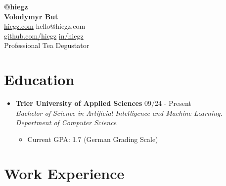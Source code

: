 \documentclass[]{article}
\begin{document}
\begin{center}
    \textbf{\Large @hiegz} \\[3pt]
    \textbf{\huge Volodymyr But} \\[7pt]

     \href{https://www.hiegz.com}{hiegz.com}
    \hspace{5pt}
     hello@hiegz.com \\[2pt]

     \href{https://github.com/hiegz}{github.com/hiegz}
    \hspace{5pt}
     \href{https://linkedin.com/in/hiegz}{in/hiegz} \\[10pt]

    Professional Tea Degustator
\end{center}

\section{Education}

\begin{itemize}[leftmargin=0.15in, rightmargin=0.15in, label={}]
    \item {\large\bfseries Trier University of Applied Sciences} \hfill 09/24 - Present \\
        {\itshape Bachelor of Science in Artificial Intelligence and Machine Learning. \\ Department of Computer Science}

        \begin{itemize}
            \item Current GPA: 1.7 (German Grading Scale)
        \end{itemize}
\end{itemize}

\section{Work Experience}
\end{document}
